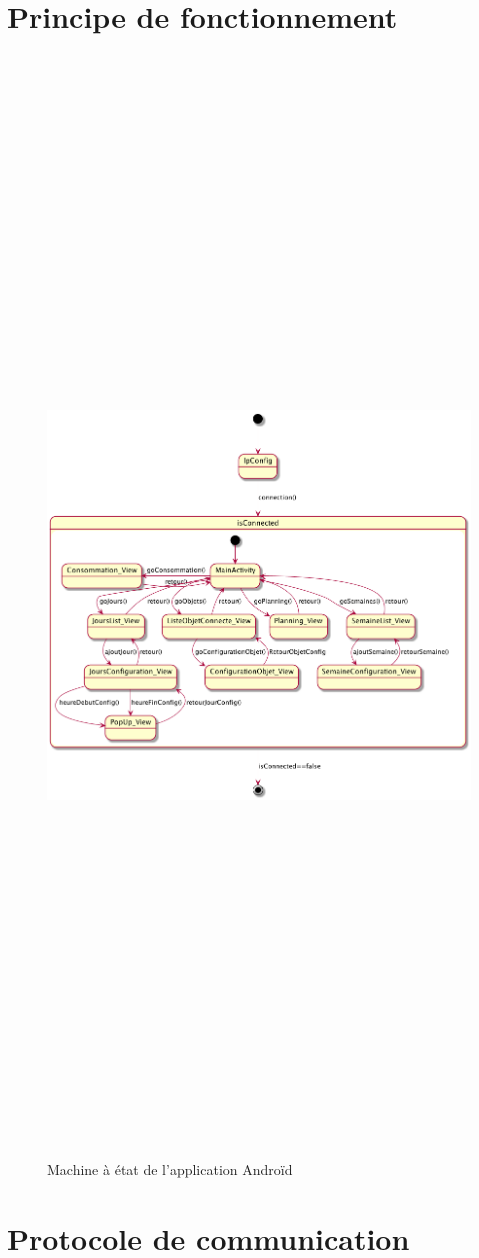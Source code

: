 \documentclass[11pt,a4paper]{report} %
\begin{document}
		
		\section{Principe de fonctionnement}
		\begin{figure}[H]
			\centering
			\includegraphics[width = 18cm ,height = 30cm,keepaspectratio]{./Picture/machine a etat java.png}
			\caption{Machine à état de l'application Androïd} 
			\label{diagClass}
		\end{figure}
		\newpage
		
		
		
		
		\section{Protocole de communication}
		
\listoffigures
\listoftables
		
\end{document}
